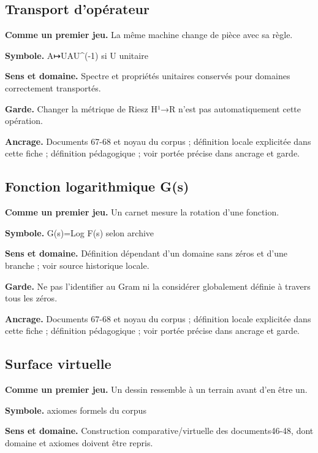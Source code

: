 \documentclass[
  9pt,
  a4paper,
]{article}
\begin{document}
\hypertarget{transport-dopuxe9rateur}{%
\subsection{Transport d'opérateur}\label{transport-dopuxe9rateur}}

\textbf{Comme un premier jeu.} La même machine change de pièce avec sa
règle.

\textbf{Symbole.} A↦UAU\^{}(-1) si U unitaire

\textbf{Sens et domaine.} Spectre et propriétés unitaires conservés pour
domaines correctement transportés.

\textbf{Garde.} Changer la métrique de Riesz H¹→R n'est pas
automatiquement cette opération.

\textbf{Ancrage.} Documents 67-68 et noyau du corpus ; définition locale
explicitée dans cette fiche ; définition pédagogique ; voir portée
précise dans ancrage et garde.

\hypertarget{fonction-logarithmique-gs}{%
\subsection{Fonction logarithmique
G(s)}\label{fonction-logarithmique-gs}}

\textbf{Comme un premier jeu.} Un carnet mesure la rotation d'une
fonction.

\textbf{Symbole.} G(s)=Log F(s) selon archive

\textbf{Sens et domaine.} Définition dépendant d'un domaine sans zéros
et d'une branche ; voir source historique locale.

\textbf{Garde.} Ne pas l'identifier au Gram ni la considérer globalement
définie à travers tous les zéros.

\textbf{Ancrage.} Documents 67-68 et noyau du corpus ; définition locale
explicitée dans cette fiche ; définition pédagogique ; voir portée
précise dans ancrage et garde.

\hypertarget{surface-virtuelle}{%
\subsection{Surface virtuelle}\label{surface-virtuelle}}

\textbf{Comme un premier jeu.} Un dessin ressemble à un terrain avant
d'en être un.

\textbf{Symbole.} axiomes formels du corpus

\textbf{Sens et domaine.} Construction comparative/virtuelle des
documents46-48, dont domaine et axiomes doivent être repris.
\end{document}

